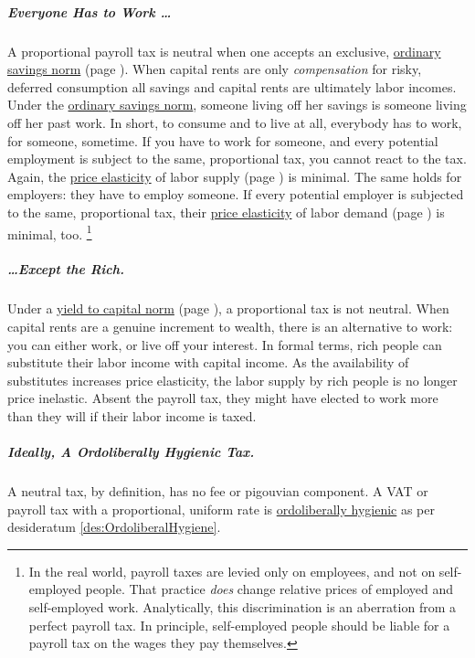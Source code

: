 \subparagraph{Everyone Has to Work \ldots}
A proportional payroll tax is neutral when one accepts an exclusive, \hyperref[sec:OSN]{ordinary savings norm} (page \pageref{sec:OSN}).
When capital rents are only \emph{compensation} for risky, deferred consumption all savings and capital rents are ultimately labor incomes.
Under the \hyperref[sec:OSN]{ordinary savings norm}, someone living off her savings is someone living off her past work.
In short, to consume and to live at all, everybody has to work, for someone, sometime.
If you have to work for someone, and every potential employment is subject to the same, proportional tax, you cannot react to the tax.
Again, the \hyperref[eq:PES]{price elasticity} of labor supply (page \pageref{eq:PES}) is minimal.
The same holds for employers:
they have to employ someone.
If every potential employer is subjected to the same, proportional tax, their \hyperref[eq:PES]{price elasticity} of labor demand (page \pageref{eq:PES}) is minimal, too.
\footnote{
	In the real world, payroll taxes are levied only on employees, and not on self-employed people.
	That practice \emph{does} change relative prices of employed and self-employed work.
	Analytically, this discrimination is an aberration from a perfect payroll tax.
	In principle, self-employed people should be liable for a payroll tax on the wages they pay themselves.
}

\subparagraph{\ldots Except the Rich.}
Under a \hyperref[sec:Y2C]{yield to capital norm} (page \pageref{sec:Y2C}), a proportional tax is not neutral.
When capital rents are a genuine increment to wealth, there is an alternative to work:
you can either work, or live off your interest.
In formal terms, rich people can substitute their labor income with capital income.
As the availability of substitutes increases price elasticity, the labor supply by rich people is no longer price inelastic.
Absent the payroll tax, they might have elected to work more than they will if their labor income is taxed.

\subparagraph{Ideally, A Ordoliberally Hygienic Tax.}
A neutral tax, by definition, has no fee or pigouvian component.
A VAT or payroll tax with a proportional, uniform rate is \hyperref[des:OrdoliberalHygiene]{ordoliberally hygienic} as per desideratum \ref{des:OrdoliberalHygiene}.

